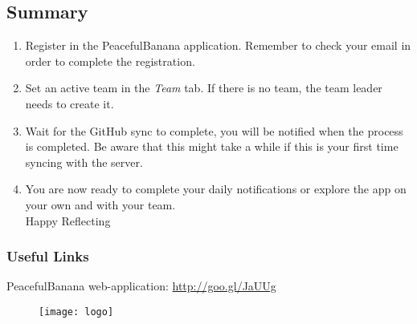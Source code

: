 \subsection{Summary}
\begin{enumerate}
\item Register in the PeacefulBanana application. Remember to check your email in order to complete the registration. 
\item Set an active team in the \textit{Team} tab. If there is no team, the team leader needs to create it. 
\item Wait for the GitHub sync to complete, you will be notified when the process is completed. Be aware that this might take a while if this is your first time syncing with the server.
\item You are now ready to complete your daily notifications or explore the app on your own and with your team. \\ Happy Reflecting
\end{enumerate}
\subsubsection*{Useful Links}
PeacefulBanana web-application: \url{http://goo.gl/JaUUg}
\begin{figure}[h!]
\label{logoappendix}
\centering
	\texttt{[image: logo]}
\end{figure}



